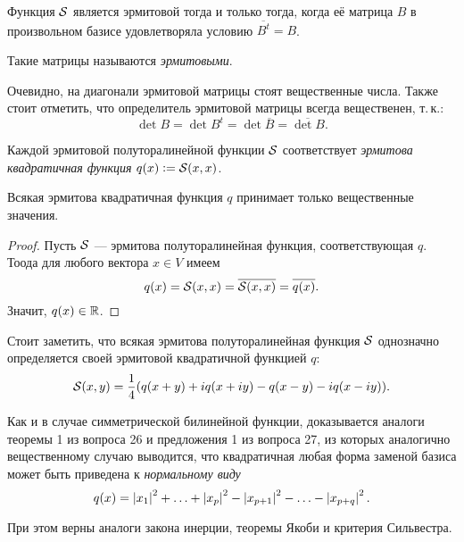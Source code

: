 Функция $\S$ является эрмитовой тогда и только тогда, когда её матрица $B$ в произвольном базисе удовлетворяла условию $\overline{B^t} = B$.

\begin{definition}
    Такие матрицы называются \textit{эрмитовыми}.
\end{definition}

Очевидно, на диагонали эрмитовой матрицы стоят вещественные числа. Также стоит отметить, что определитель эрмитовой матрицы всегда вещественен, т.\,к.:
\[
    \det B = \det B^t = \det \overline{B} = \overline{\det B}.
\]

\begin{definition}
    Каждой эрмитовой полуторалинейной функции $\S$ соответствует \textit{эрмитова квадратичная функция} $q(x) \vcentcolon = \S(x, x)$.
\end{definition}

\begin{proposal}
    Всякая эрмитова квадратичная функция $q$ принимает только вещественные значения.
\end{proposal}

\begin{proof}
    Пусть $\S$ --- эрмитова полуторалинейная функция, соответствующая $q$. Тоода для любого вектора $x \in V$ имеем
    \[
        q(x) = \S(x, x) = \overline{\S(x, x)} = \overline{q(x)}.
    \]
    Значит, $q(x) \in \R$.
\end{proof}

Стоит заметить, что всякая эрмитова полуторалинейная функция $\S$ однозначно определяется своей эрмитовой квадратичной функцией $q$:
\[
    \S(x, y) = \frac{1}{4}(q(x + y) + iq(x + iy) - q(x - y) - iq(x - iy)).
\]

Как и в случае симметрической билинейной функции, доказывается аналоги теоремы 1 из вопроса 26 и предложения 1 из вопроса 27, из которых аналогично вещественному случаю выводится, что квадратичная любая форма заменой базиса может быть приведена к \textit{нормальному виду}
\[
    q(x) = \abs{x_1}^2 + \ldots + \abs{x_p}^2 - \abs{x_{p + 1}}^2 - \ldots - \abs{x_{p + q}}^2.
\]

При этом верны аналоги закона инерции, теоремы Якоби и критерия Сильвестра.

